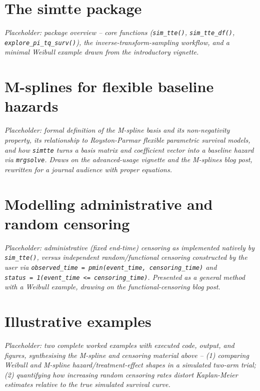 \section{The simtte package}\label{the-simtte-package}

\emph{Placeholder: package overview -- core functions (\texttt{sim\_tte()},
\texttt{sim\_tte\_df()}, \texttt{explore\_pi\_tq\_surv()}), the inverse-transform-sampling
workflow, and a minimal Weibull example drawn from the introductory
vignette.}

\section{M-splines for flexible baseline hazards}\label{m-splines-for-flexible-baseline-hazards}

\emph{Placeholder: formal definition of the M-spline basis and its
non-negativity property, its relationship to Royston-Parmar flexible
parametric survival models, and how \texttt{simtte} turns a basis matrix and
coefficient vector into a baseline hazard via \texttt{mrgsolve}. Draws on the
advanced-usage vignette and the M-splines blog post, rewritten for a
journal audience with proper equations.}

\section{Modelling administrative and random censoring}\label{modelling-administrative-and-random-censoring}

\emph{Placeholder: administrative (fixed end-time) censoring as implemented
natively by \texttt{sim\_tte()}, versus independent random/functional censoring
constructed by the user via \texttt{observed\_time\ =\ pmin(event\_time,\ censoring\_time)} and \texttt{status\ =\ 1(event\_time\ \textless{}=\ censoring\_time)}.
Presented as a general method with a Weibull example, drawing on the
functional-censoring blog post.}

\section{Illustrative examples}\label{illustrative-examples}

\emph{Placeholder: two complete worked examples with executed code, output,
and figures, synthesising the M-spline and censoring material above --
(1) comparing Weibull and M-spline hazard/treatment-effect shapes in a
simulated two-arm trial; (2) quantifying how increasing random censoring
rates distort Kaplan-Meier estimates relative to the true simulated
survival curve.}

